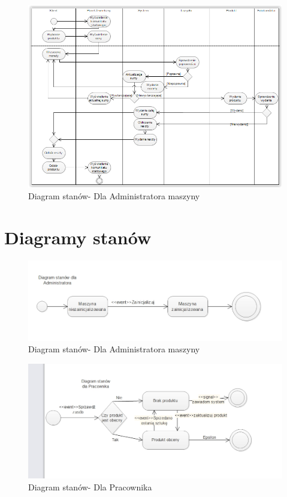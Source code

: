 \documentclass[a4paper, 11pt]{article}
\begin{document}
\begin{figure}[H]
\centerline{\includegraphics[scale=0.9]{../Diagrams/diagramAktywnosci}}
\caption{Diagram stanów- Dla Administratora maszyny}
\end{figure}
\section{Diagramy stanów}

\begin{figure}[H]
\centerline{\includegraphics[scale=0.9]{../Diagrams/stanyAdmin}}
\caption{Diagram stanów- Dla Administratora maszyny}
\end{figure}

\begin{figure}[H]
\centerline{\includegraphics[scale=0.9]{../Diagrams/stanyPracownik}}
\caption{Diagram stanów- Dla Pracownika}
\end{figure}
\end{document}

